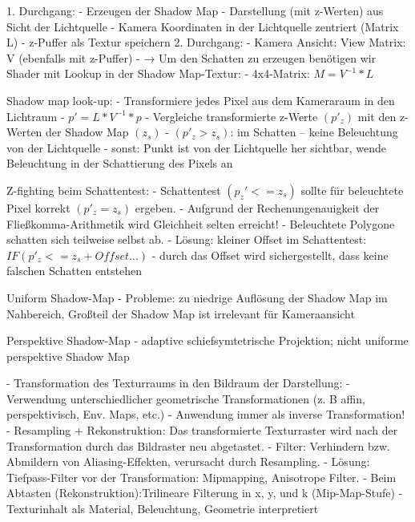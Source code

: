 \documentclass[10pt,landscape]{article}
\makeatletter
\renewcommand{\subsection}{\@startsection{subsection}{2}{0mm}%
                                {-1explus -.5ex minus -.2ex}%
                                {0.5ex plus .2ex}%
                                {\normalfont\normalsize\bfseries}}
\makeatother
\begin{document}
\begin{multicols}{3}
1. Durchgang: 
     - Erzeugen der Shadow Map
     - Darstellung (mit z-Werten) aus Sicht der Lichtquelle
     - Kamera Koordinaten in der Lichtquelle zentriert (Matrix L)
     - z-Puffer als Textur speichern
2. Durchgang:
    - Kamera Ansicht: View Matrix: V (ebenfalls mit z-Puffer)
    - → Um den Schatten zu erzeugen benötigen wir Shader mit Lookup in der Shadow Map-Textur:
    - 4x4-Matrix: $M = V^{-1}*L$


Shadow map look-up:
- Transformiere jedes Pixel aus dem Kameraraum in den Lichtraum
- $p'=L*V^{-1}*p$
- Vergleiche transformierte z-Werte $(p'_z)$ mit den z-Werten der Shadow Map $(z_s)$
  - $(p'_z>z_s)$: im Schatten – keine Beleuchtung von der Lichtquelle
  - sonst: Punkt ist von der Lichtquelle her sichtbar, wende Beleuchtung in der Schattierung des Pixels an

Z-fighting beim Schattentest:
- Schattentest $(p_z' <= z_s )$ sollte für beleuchtete Pixel korrekt $(p'_z = z_s)$ ergeben.
- Aufgrund der Rechenungenauigkeit der Fließkomma-Arithmetik wird Gleichheit selten erreicht!
- Beleuchtete Polygone schatten sich teilweise selbst ab.
- Lösung: kleiner Offset im Schattentest: $IF (p'_z <= z_s + Offset...)$
- durch das Offset wird sichergestellt, dass keine falschen Schatten entstehen

Uniform Shadow-Map
- Probleme: zu niedrige Auflösung der Shadow Map im Nahbereich, Großteil der Shadow Map ist irrelevant für Kameraansicht

Perspektive Shadow-Map
- adaptive schiefsymtetrische Projektion; nicht uniforme perspektive Shadow Map

- Transformation des Texturraums in den Bildraum der Darstellung: 
  - Verwendung unterschiedlicher geometrische Transformationen (z. B affin, perspektivisch, Env. Maps, etc.) 
  - Anwendung immer als inverse Transformation!
- Resampling + Rekonstruktion: Das transformierte Texturraster wird nach der Transformation durch das Bildraster neu abgetastet.
- Filter: Verhindern bzw. Abmildern von Aliasing-Effekten, verursacht durch Resampling.
  - Lösung: Tiefpass-Filter vor der Transformation: Mipmapping, Anisotrope Filter.
  - Beim Abtasten (Rekonstruktion):Trilineare Filterung in x, y, und k (Mip-Map-Stufe)
- Texturinhalt als Material, Beleuchtung, Geometrie interpretiert



\end{multicols}
\end{document}
